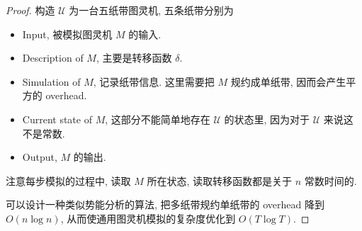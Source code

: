 \documentclass[8pt]{article}
\theoremstyle{compact}
\begin{document}
\begin{proof}
	构造 $\mathcal U$ 为一台五纸带图灵机, 五条纸带分别为
	\begin{itemize}
		\item Input, 被模拟图灵机 $M$ 的输入.
		\item Description of $M$, 主要是转移函数 $\delta$.
		\item Simulation of $M$, 记录纸带信息. 这里需要把 $M$ 规约成单纸带, 因而会产生平方的 overhead.
		\item Current state of $M$, 这部分不能简单地存在 $\mathcal U$ 的状态里, 因为对于 $\mathcal U$ 来说这不是常数.
		\item Output, $M$ 的输出.
	\end{itemize}

	注意每步模拟的过程中, 读取 $M$ 所在状态, 读取转移函数都是关于 $n$ 常数时间的.

	可以设计一种类似势能分析的算法, 把多纸带规约单纸带的 overhead 降到 $O(n \log n)$, 从而使通用图灵机模拟的复杂度优化到 $O(T \log T)$.
\end{proof}

\newpage
\end{document}
